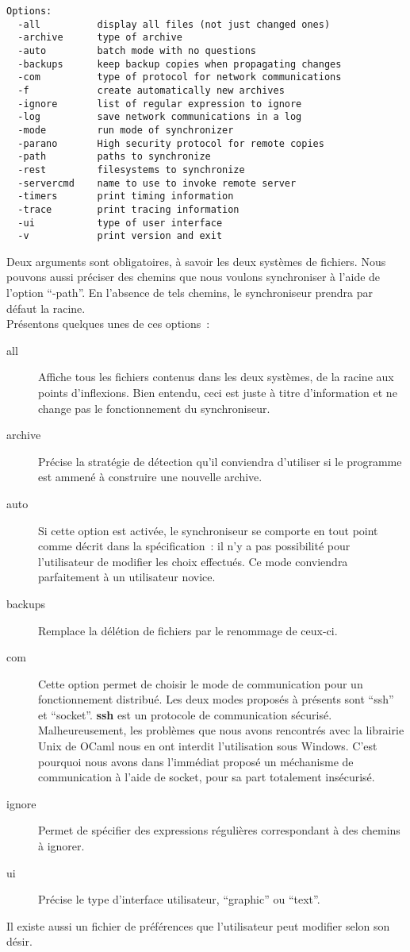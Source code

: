 \documentclass[11pt]{report}
\newcommand{\func}[1]{\textbf{#1}}
\begin{document}
{\begin{verbatim}
Options: 
  -all          display all files (not just changed ones)
  -archive      type of archive
  -auto         batch mode with no questions
  -backups      keep backup copies when propagating changes
  -com          type of protocol for network communications
  -f            create automatically new archives
  -ignore       list of regular expression to ignore
  -log          save network communications in a log
  -mode         run mode of synchronizer
  -parano       High security protocol for remote copies
  -path         paths to synchronize
  -rest         filesystems to synchronize
  -servercmd    name to use to invoke remote server
  -timers       print timing information
  -trace        print tracing information
  -ui           type of user interface
  -v            print version and exit
\end{verbatim}
Deux arguments sont obligatoires, \`a savoir les deux syst\`emes de fichiers.
Nous pouvons aussi pr\'eciser des chemins que nous voulons synchroniser \`a
l'aide de l'option ``-path''. En l'absence de tels chemins, le synchroniseur
prendra par d\'efaut la racine.\\
Pr\'esentons quelques unes de ces options~:
\begin{description}
\item [all] Affiche tous les fichiers contenus dans les deux syst\`emes, de 
la racine aux points d'inflexions. Bien entendu, ceci est juste \`a titre
d'information et ne change pas le fonctionnement du synchroniseur.
\item [archive] Pr\'ecise la strat\'egie de d\'etection qu'il conviendra
d'utiliser si le programme est ammen\'e \`a construire une nouvelle archive.
\item [auto] Si cette option est activ\'ee, le synchroniseur se comporte en
tout point comme d\'ecrit dans la sp\'ecification~: il n'y a pas possibilit\'e
pour l'utilisateur de modifier les choix effectu\'es. Ce mode conviendra
parfaitement \`a un utilisateur novice.
\item [backups] Remplace la d\'el\'etion de fichiers par le renommage de ceux-ci.
\item [com] Cette option permet de choisir le mode de communication pour un
fonctionnement distribu\'e. Les deux modes propos\'es \`a pr\'esents sont
``ssh'' et ``socket''. \func{ssh} est un protocole de communication 
s\'ecuris\'e. 
Malheureusement, les probl\`emes que nous avons rencontr\'es avec
la librairie Unix de OCaml nous en ont interdit l'utilisation sous Windows.
C'est pourquoi nous avons dans l'imm\'ediat propos\'e un m\'echanisme de
communication \`a l'aide de socket, pour sa part totalement ins\'ecuris\'e.
\item [ignore] Permet de sp\'ecifier des expressions r\'eguli\`eres 
correspondant \`a des chemins \`a ignorer.
\item [ui] Pr\'ecise le type d'interface utilisateur, ``graphic'' ou ``text''.
\end{description}
Il existe aussi un fichier de pr\'ef\'erences que l'utilisateur peut modifier
selon son d\'esir.
}
\end{document}
